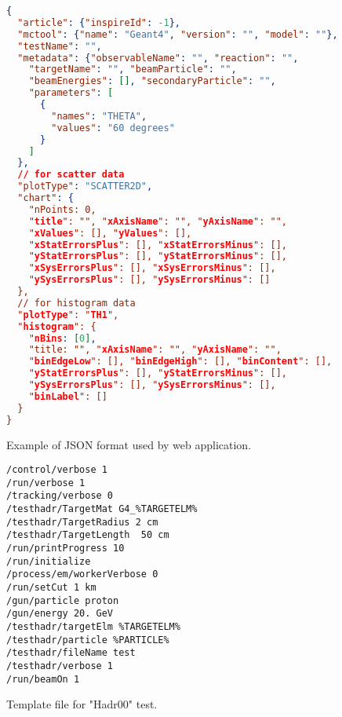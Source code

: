 


\begin{figure}

\begin{lstlisting}[language=json,firstnumber=1]
{
  "article": {"inspireId": -1},
  "mctool": {"name": "Geant4", "version": "", "model": ""},
  "testName": "",
  "metadata": {"observableName": "", "reaction": "",
    "targetName": "", "beamParticle": "",
    "beamEnergies": [], "secondaryParticle": "",
    "parameters": [
      {
        "names": "THETA",
        "values": "60 degrees"
      }
    ]
  },
  // for scatter data
  "plotType": "SCATTER2D",
  "chart": {
    "nPoints: 0,
    "title": "", "xAxisName": "", "yAxisName": "",
    "xValues": [], "yValues": [],
    "xStatErrorsPlus": [], "xStatErrorsMinus": [],
    "yStatErrorsPlus": [], "yStatErrorsMinus": [],
    "xSysErrorsPlus": [], "xSysErrorsMinus": [],
    "ySysErrorsPlus": [], "ySysErrorsMinus": []
  },
  // for histogram data
  "plotType": "TH1",
  "histogram": {
    "nBins: [0],
    "title: "", "xAxisName": "", "yAxisName": "",
    "binEdgeLow": [], "binEdgeHigh": [], "binContent": [],
    "yStatErrorsPlus": [], "yStatErrorsMinus": [],
    "ySysErrorsPlus": [], "ySysErrorsMinus": [],
    "binLabel": []
  }
}
\end{lstlisting}

\caption{Example of JSON format used by web application.}
\label{JSON-format}
\end{figure}

\begin{figure}
\begin{lstlisting}
/control/verbose 1
/run/verbose 1
/tracking/verbose 0
/testhadr/TargetMat G4_%TARGETELM%
/testhadr/TargetRadius 2 cm
/testhadr/TargetLength  50 cm
/run/printProgress 10
/run/initialize
/process/em/workerVerbose 0
/run/setCut 1 km
/gun/particle proton
/gun/energy 20. GeV
/testhadr/targetElm %TARGETELM%
/testhadr/particle %PARTICLE%
/testhadr/fileName test
/testhadr/verbose 1
/run/beamOn 1
\end{lstlisting}
\caption{Template file for "Hadr00" test.}
\label{hadr00-template}
\end{figure}

